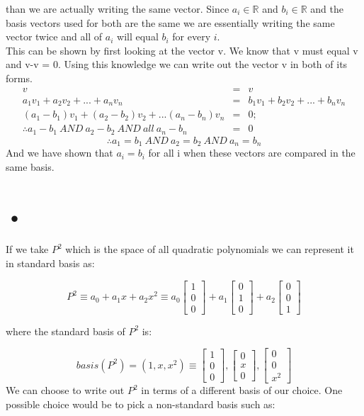 \documentclass[12pt]{article}
\begin{document}
than we are actually writing the same vector. Since $a_i \in \mathbb{R}$ and $b_i \in \mathbb{R}$ and the basis vectors used for both are the same we are essentially writing the same vector twice and all of $a_i$ will equal $b_i$ for every $i$.\\

This can be shown by first looking at the vector v. We know that v must equal v and v-v = 0. Using this knowledge we can write out the vector v in both of its forms.
\begin{eqnarray*}
v &=& v\\
a_1 v_1 + a_2 v_2 + ... + a_n v_n &=& b_1 v_1 + b_2 v_2 + ... + b_n v_n\\
(a_1 - b_1) v_1 + (a_2 - b_2) v_2 + ... (a_n - b_n) v_n &=& 0;\\
\therefore a_1 - b_1\ AND\ a_2 - b_2\ AND\ all\ a_n - b_n  &=& 0
\end{eqnarray*} 
$$\therefore a_1 = b_1\ AND\ a_2 = b_2\ AND\ a_n = b_n $$
And we have shown that $a_i = b_i$ for all i when these vectors are compared in the same basis.

\section{•}
 
If we take $P^2$ which is the space of all quadratic polynomials we can represent it in standard basis as:

\[P^2 \equiv a_0 + a_1 x + a_2 x^2 \equiv
a_0
\begin{bmatrix}
1\\
0\\
0
\end{bmatrix}
+ a_1
\begin{bmatrix}
0\\
1\\
0
\end{bmatrix}
+ a_2
\begin{bmatrix}
0\\
0\\
1
\end{bmatrix}
\]

where the standard basis of $P^2$ is:

\[ basis(P^2) = (1, x, x^2) 
\equiv \begin{bmatrix}
1\\
0\\
0
\end{bmatrix}
,
\begin{bmatrix}
0\\
x\\
0
\end{bmatrix}
,
\begin{bmatrix}
0\\
0\\
x^2
\end{bmatrix}
\]
We can choose to write out $P^2$ in terms of a different basis of our choice. One possible choice would be to pick a non-standard basis such as:
\end{document}

